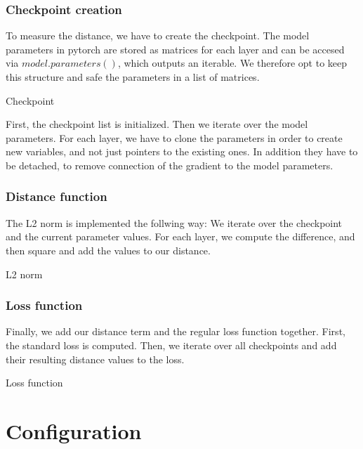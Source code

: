 \subsubsection{Checkpoint creation}
To measure the distance, we have to create the checkpoint. The model parameters
in pytorch are stored as matrices for each layer and can be accesed via
$model.parameters()$, which outputs an iterable. We therefore opt to keep this
structure and safe the parameters in a list of matrices.
\begin{algorithm}[h!]
    \caption{Checkpoint}\label{alg:Checkpoint}
    \lstset{language=Python}
    
\end{algorithm}
\newline
First, the checkpoint list is initialized. Then we iterate over the model
parameters. For each layer, we have to clone the parameters in order to create
new variables, and not just pointers to the existing ones. In addition they have
to be detached, to remove connection of the gradient to the model parameters.

\subsubsection{Distance function}
The L2 norm is implemented the follwing way: We iterate over the checkpoint and
the current parameter values. For each layer, we compute the difference, and
then square and add the values to our distance.
\begin{algorithm}[h!]
    \caption{L2 norm}\label{alg:L2Norm}
    \lstset{language=Python}
    
\end{algorithm}

\subsubsection{Loss function}
Finally, we add our distance term and the regular loss function together. First,
the standard loss is computed. Then, we iterate over all checkpoints and add
their resulting distance values to the loss.
\begin{algorithm}[h!]
    \caption{Loss function}
    \lstset{language=Python}
    
\end{algorithm}



\section{Configuration}

